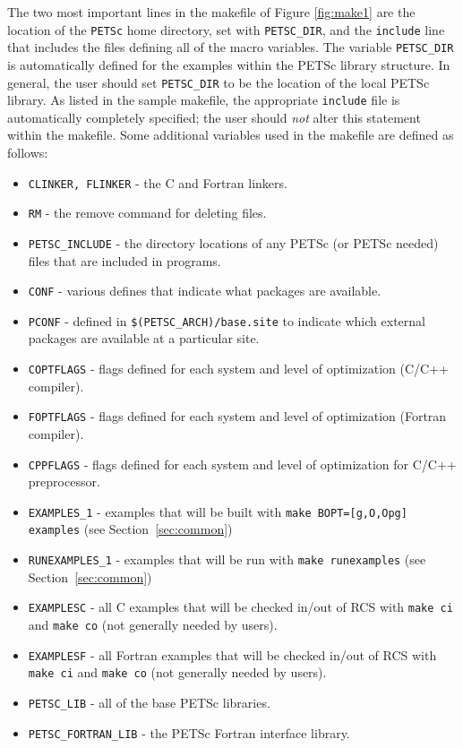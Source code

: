 The two most important lines in the makefile of Figure \ref{fig:make1}
are the location of the {\tt PETSc} home directory, set with {\tt PETSC\_DIR}, 
and the {\tt include} line that includes the files
defining all of the macro variables. The variable {\tt PETSC\_DIR} is
automatically defined for the examples within the PETSc library 
structure.  In general, the user should set {\tt PETSC\_DIR} 
to  be the location of the local
PETSc library.  As listed in the sample makefile, the appropriate
{\tt include} file is automatically completely specified; the user should
{\em not} alter this statement within the makefile.  Some additional
variables used in the makefile are defined as follows:
\begin{itemize}
\item {\tt CLINKER, FLINKER} - the C and Fortran linkers. 
\item {\tt RM} - the remove command for deleting files.
\item {\tt PETSC\_INCLUDE} - the directory locations of any PETSc (or PETSc
            needed) files that are included in programs. 
\item {\tt CONF} - various defines that indicate what packages are available.
\item {\tt PCONF} - defined in {\tt \$(PETSC\_ARCH)/base.site} to 
            indicate which external packages are available at a particular site.
\item {\tt COPTFLAGS} - flags defined for each system and level of 
                        optimization (C/C++ compiler).
\item {\tt FOPTFLAGS} - flags defined for each system and level of 
                        optimization (Fortran compiler).
\item {\tt CPPFLAGS} - flags defined for each system and level of 
                        optimization for C/C++ preprocessor.
\item {\tt EXAMPLES\_1} - examples that will be built with
             {\tt make BOPT=[g,O,Opg] examples} (see Section~\ref{sec:common})
\item {\tt RUNEXAMPLES\_1} - examples that will be run with
             {\tt make runexamples} (see Section~\ref{sec:common})
\item {\tt EXAMPLESC} - all C examples that will be checked in/out of RCS
             with {\tt make ci} and {\tt make co} (not generally
             needed by users).
\item {\tt EXAMPLESF} - all Fortran examples that will be checked in/out of
             RCS with {\tt make ci} and {\tt make co} (not generally
             needed by users).
\item {\tt PETSC\_LIB} - all of the base PETSc libraries.
\item {\tt PETSC\_FORTRAN\_LIB} - the PETSc Fortran interface 
             library. 
\end{itemize}
